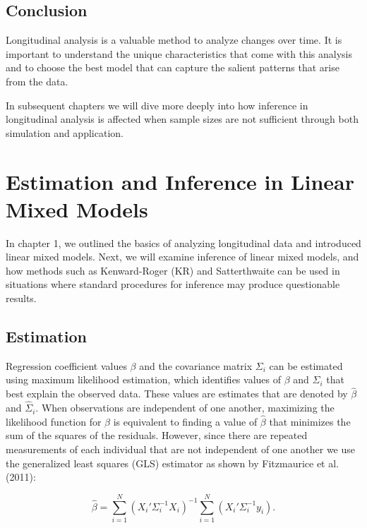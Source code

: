 \documentclass[12pt, twoside]{amherstthesis}
\begin{document}
\hypertarget{conclusion}{%
\section{Conclusion}\label{conclusion}}

Longitudinal analysis is a valuable method to analyze changes over time. It is important to understand the unique characteristics that come with this analysis and to choose the best model that can capture the salient patterns that arise from the data.

In subsequent chapters we will dive more deeply into how inference in longitudinal analysis is affected when sample sizes are not sufficient through both simulation and application.

\hypertarget{rmd-basics}{%
\chapter{Estimation and Inference in Linear Mixed Models}\label{rmd-basics}}

In chapter 1, we outlined the basics of analyzing longitudinal data and introduced linear mixed models. Next, we will examine inference of linear mixed models, and how methods such as Kenward-Roger (KR) and Satterthwaite can be used in situations where standard procedures for inference may produce questionable results.

\hypertarget{estimation}{%
\section{Estimation}\label{estimation}}

Regression coefficient values \(\beta\) and the covariance matrix \(\Sigma_i\) can be estimated using maximum likelihood estimation, which identifies values of \(\beta\) and \(\Sigma_i\) that best explain the observed data. These values are estimates that are denoted by \(\hat\beta\) and \(\hat\Sigma_i.\) When observations are independent of one another, maximizing the likelihood function for \(\beta\) is equivalent to finding a value of \(\hat\beta\) that minimizes the sum of the squares of the residuals. However, since there are repeated measurements of each individual that are not independent of one another we use the generalized least squares (GLS) estimator as shown by Fitzmaurice et al. (2011):

\[\hat\beta = \sum_{i=1}^N(X_i'\Sigma^{-1}_iX_i)^{-1}\sum_{i=1}^N(X_i'\Sigma^{-1}_iy_i).\]
\end{document}
